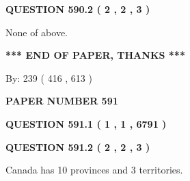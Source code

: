 \documentclass[12pt]{article}
\begin{document}
\vspace{0.2in}
  
{\textbf{\Large{QUESTION
590.2 
 ( 2 , 2 , 3 )
}}}
  
  
 
 
\noindent{}
 
 
 None of above.
 
 
 
 
   
   
 \vspace{0.2in}
 
   
   
   
   
\vspace{1.0in} 
{\textbf{\large{ *** END OF PAPER, THANKS *** }}} 
   
   
\hspace{1.0in} By: 
 239 ( 416 ,  613 )
   
   
   
   
\newpage 
\setcounter{page}{ 
   591001 } 
   
   
   
   
 {\textbf{ \Large{ PAPER NUMBER  591  }}}
   
   
\vspace{0.2in}
   
   
   
   
   
   
 \vspace{0.2in}
 
 
 
 
   
   
  
\vspace{0.2in}
  
{\textbf{\Large{QUESTION
591.1 
 ( 1 , 1 , 6791 )
}}}
  
  
  
\vspace{0.2in}
  
{\textbf{\Large{QUESTION
591.2 
 ( 2 , 2 , 3 )
}}}
  
  
 
 
\noindent{}
 
 
Canada has 10  provinces and 3 territories.
 
\end{document}
